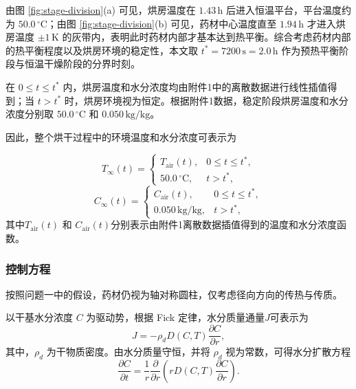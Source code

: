 \documentclass[12pt,a4paper]{article}
\begin{document}
由图 \ref{fig:stage-division}(a) 可见，烘房温度在 $1.43\,\mathrm{h}$ 后进入恒温平台，平台温度约为 $50.0\,^\circ\mathrm{C}$；由图 \ref{fig:stage-division}(b) 可见，药材中心温度直至 $1.94\,\mathrm{h}$ 才进入烘房温度 $\pm 1\,\mathrm{K}$ 的灰带内，表明此时药材内部才基本达到热平衡。综合考虑药材内部的热平衡程度以及烘房环境的稳定性，本文取
$t^*=7200\,\mathrm{s}=2.0\,\mathrm{h}$
作为预热平衡阶段与恒温干燥阶段的分界时刻。

在 $0\leq t\leq t^*$ 内，烘房温度和水分浓度均由附件1中的离散数据进行线性插值得到；当 $t>t^*$ 时，烘房环境视为恒定。根据附件1数据，稳定阶段烘房温度和水分浓度分别取 $50.0\,^\circ\mathrm{C}$ 和 $0.050\,\mathrm{kg/kg}$。

因此，整个烘干过程中的环境温度和水分浓度可表示为

\begin{equation}
T_\infty(t)=
\begin{cases}
T_{\mathrm{air}}(t), & 0\leq t\leq t^*,\\
50.0\,^\circ\mathrm{C}, & t>t^*,
\label{eq:T}
\end{cases}
\end{equation}
\begin{equation}
C_\infty(t)=
\begin{cases}
C_{\mathrm{air}}(t), & 0\leq t\leq t^*,\\
0.050\,\mathrm{kg/kg}, & t>t^*,
\end{cases}
\label{eq:C}
\end{equation}
其中$T_{\mathrm{air}}(t)$ 和 $C_{\mathrm{air}}(t)$分别表示由附件1离散数据插值得到的温度和水分浓度函数。




\subsubsection{控制方程}

按照问题一中的假设，药材仍视为轴对称圆柱，仅考虑径向方向的传热与传质。

以干基水分浓度 $C$ 为驱动势，根据 Fick 定律，水分质量通量$J$可表示为
\begin{equation}
J=-\rho_d D(C,T)\frac{\partial C}{\partial r},
\end{equation}
其中，$\rho_d$ 为干物质密度。由水分质量守恒，并将 $\rho_d$ 视为常数，可得水分扩散方程
\begin{equation}
\frac{\partial C}{\partial t}
=
\frac{1}{r}
\frac{\partial}{\partial r}
\left(
rD(C,T)\frac{\partial C}{\partial r}
\right).
\label{eq:moisture2}
\end{equation}
\end{document}
